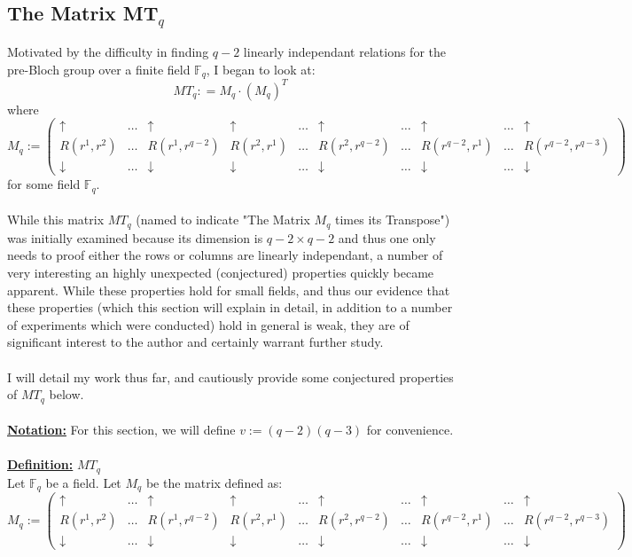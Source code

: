 \documentclass[11pt]{article}
\theoremstyle{plain}
\theoremstyle{definition}
\begin{document}
\subsection{The Matrix MT$_q$}\label{subsection: MTQ}
Motivated by the difficulty in finding $q-2$ linearly independant relations for the pre-Bloch group over a finite field $\mathbb{F}_q$, I began to look at:
\begin{equation*}
MT_q : = M_q \cdot (M_q) ^T
\end{equation*}
where
\[ M_q := \left( \begin{array}{ccccccccccc}
\uparrow  & \dots  & \uparrow &  \uparrow &   \dots &  \uparrow & \dots  & \uparrow  & \dots & \uparrow \\
R(r^1, r^2) &   \dots &  R(r^1, r^{q-2}) & R(r^2, r^1)  & \dots & R(r^2, r^{q-2}) & \dots &  R(r^{q-2}, r^1) & \dots & R(r^{q-2}, r^{q-3})  \\
\downarrow  & \dots  & \downarrow &  \downarrow  & \dots &  \downarrow & \dots  & \downarrow & \dots & \downarrow \end{array} \right)\] 
for some field $\mathbb{F}_q$.\\
\\
While this matrix $MT_q$ (named to indicate "The Matrix $M_q$ times its Transpose") was initially examined because its dimension is $q-2 \times q-2$ and thus one only needs to proof either the rows or columns are linearly independant, a number of very interesting an highly unexpected (conjectured) properties quickly became apparent. While these properties hold for small fields, and thus our evidence that these properties (which this section will explain in detail, in addition to a number of experiments which were conducted) hold in general is weak, they are of significant interest to the author and certainly warrant further study. \\
\\
I will detail my work thus far, and cautiously provide some conjectured properties of $MT_q$ below. \\
\\
\textbf{\underline{Notation:}} For this section, we will define $v:= (q-2) (q-3)$ for convenience.\\
\\
\textbf{\underline{Definition:}} $MT_q$\\
Let $\mathbb{F}_q$ be a field. Let $M_q$ be the matrix defined as:
\[ M_q := \left( \begin{array}{ccccccccccc}
\uparrow  & \dots  & \uparrow &  \uparrow &   \dots &  \uparrow & \dots  & \uparrow  & \dots & \uparrow \\
R(r^1, r^2) &   \dots &  R(r^1, r^{q-2}) & R(r^2, r^1)  & \dots & R(r^2, r^{q-2}) & \dots &  R(r^{q-2}, r^1) & \dots & R(r^{q-2}, r^{q-3})  \\
\downarrow  & \dots  & \downarrow &  \downarrow  & \dots &  \downarrow & \dots  & \downarrow & \dots & \downarrow \end{array} \right)\] 
\end{document}

